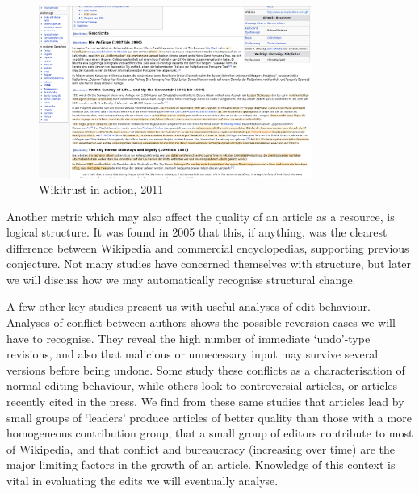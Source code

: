 \documentclass[a4paper,11pt,twoside,notitlepage]{article}
\begin{document}
       \begin{figure}
         \centering
         \includegraphics[width=0.8\textwidth,clip=true,resolution=300]{img/wikitrust.png}
         \caption{Wikitrust in action, 2011}
         \label{fig:wikitrust}
       \end{figure}

        Another metric which may also affect the quality of an article as
        a resource, is logical structure. It was found in 2005 that
        this, if anything, was the clearest difference between
        Wikipedia and commercial encyclopedias,\cite{Giles2005}
        supporting previous conjecture.\cite{Denning2005} Not many
        studies have concerned themselves with structure, but later we
        will discuss how we may automatically recognise structural
        change.
        
        A few other key studies present us with useful analyses of
        edit behaviour. Analyses of conflict between authors shows the
        possible reversion cases we will have to recognise. They
        reveal the high number of immediate `undo'-type revisions, and
        also that malicious or unnecessary input may survive several
        versions before being undone. Some study these conflicts as a
        characterisation of normal editing
        behaviour,\cite{Kittur2007}\cite{Kittur2009}\cite{Kittur2010}\cite{Potthast2008}
        while others look to controversial articles,\cite{Iba2010} or
        articles recently cited in the press.\cite{Lih2004} We find
        from these same studies that articles lead by small groups of
        `leaders' produce articles of better quality than those with a
        more homogeneous contribution group, that a small group of
        editors contribute to most of Wikipedia, and that conflict and
        bureaucracy (increasing over time) are the major limiting
        factors in the growth of an article.\cite{Suh2009} Knowledge
        of this context is vital in evaluating the edits we will
        eventually analyse.
\end{document}
